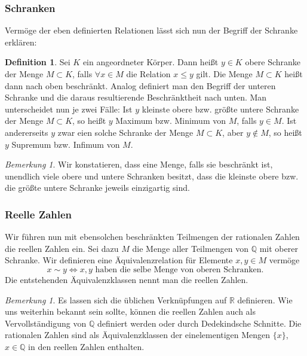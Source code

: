 \documentclass[fontsize=12pt,paper=a4,twoside,bibtotoc,idxtotoc,
liststotoc,pagesize,BCOR1.2cm,DIV15,chapterprefix,pagesize=pdftex]{scrbook}
\theoremstyle{plain}
\theoremstyle{definition}
\newtheorem{df}[equation]{Definition}
\theoremstyle{remark}
\newtheorem{bem}[equation]{Bemerkung}
\begin{document}
\subsubsection{Schranken}
Vermöge der eben definierten Relationen lässt sich nun der Begriff der Schranke erklären:
\begin{df}
Sei $K$ ein angeordneter Körper. Dann heißt $y\in K$ obere Schranke der Menge $M\subset K$, falls $\forall x\in M$ die Relation $x\leq y$ gilt. 
Die Menge $M\subset K$ heißt dann nach oben beschränkt. Analog definiert man den Begriff der unteren Schranke und die daraus resultierende 
Beschränktheit nach unten. Man unterscheidet nun je zwei Fälle: Ist $y$ kleinste obere bzw. größte untere Schranke der Menge $M\subset K$, so heißt $y$ Maximum bzw. 
Minimum von $M$, falls $y\in M$. Ist andererseits $y$ zwar eien solche Schranke der Menge $M\subset K$, aber $y\not\in M$, so heißt $y$ Supremum bzw. Infimum von $M$.
\end{df}
\begin{bem}
 Wir konstatieren, dass eine Menge, falls sie beschränkt ist, unendlich viele obere und untere Schranken besitzt, dass die kleinste obere 
bzw. die größte untere Schranke jeweils einzigartig sind.
\end{bem}
\subsubsection{Reelle Zahlen}
Wir führen nun mit ebensolchen beschränkten Teilmengen der rationalen Zahlen die reellen Zahlen ein.
 Sei dazu $M$ die Menge aller Teilmengen von $\mathbb{Q}$ mit oberer
Schranke. Wir definieren eine Äquivalenzrelation für Elemente $x,y\in M$ vermöge
\[x\sim y \Longleftrightarrow x,y \text{ haben die selbe Menge von oberen Schranken.}\]
Die entstehenden Äquivalenzklassen nennt man die reellen Zahlen.
\begin{bem}
 Es lassen sich die üblichen Verknüpfungen auf $\mathbb{R}$
definieren. Wie uns weiterhin bekannt sein sollte, können die reellen Zahlen auch als Vervollständigung von
$\mathbb{Q}$ definiert werden oder durch Dedekindsche Schnitte. Die rationalen Zahlen sind als Äquivalenzklassen der
einelementigen Mengen $\{ x \}$, $x \in \mathbb{Q}$ in den reellen Zahlen enthalten.
\end{bem}
\end{document}
